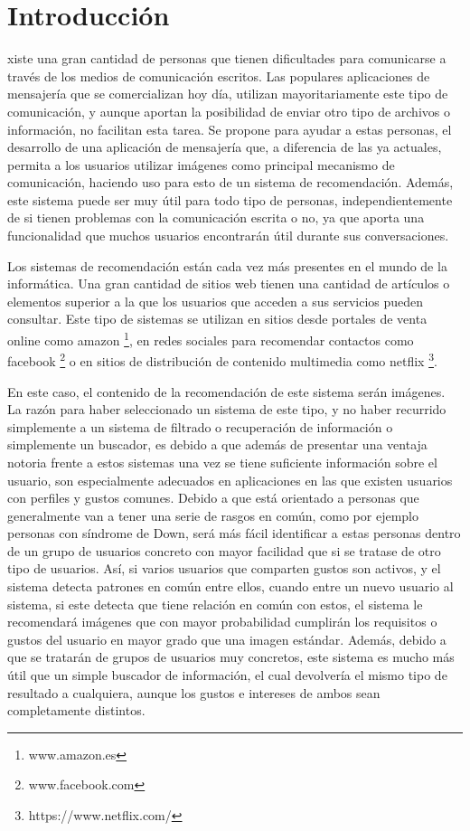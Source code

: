 \chapter{Introducción}
\label{chap:intro}

\noindent
{}xiste una gran cantidad de personas que tienen dificultades para comunicarse a través de los medios de comunicación escritos. Las populares aplicaciones de mensajería que se comercializan hoy día, utilizan mayoritariamente este tipo de comunicación, y aunque  aportan la posibilidad de enviar otro tipo de archivos o información, no facilitan esta tarea. Se propone para ayudar a estas personas, el desarrollo de una aplicación de mensajería que, a diferencia de las ya actuales, permita a los usuarios utilizar imágenes como principal mecanismo de comunicación, haciendo uso para esto de un sistema de recomendación. Además, este sistema puede ser muy útil para todo tipo de personas, independientemente de si tienen problemas con la comunicación escrita o no, ya que aporta una funcionalidad que muchos usuarios encontrarán útil durante sus conversaciones.


Los sistemas de recomendación están cada vez más presentes en el mundo de la informática. Una gran cantidad de sitios web tienen una cantidad de artículos o elementos superior a la que los usuarios que acceden a sus servicios pueden consultar. Este tipo de sistemas se utilizan en sitios desde portales de venta online como amazon \footnote{www.amazon.es}, en redes sociales para recomendar contactos como facebook \footnote{www.facebook.com} o en sitios de distribución de contenido multimedia como netflix \footnote{https://www.netflix.com/}. 

En este caso, el contenido de la recomendación de este sistema serán imágenes. La razón para haber seleccionado un sistema de este tipo, y no haber recurrido simplemente a un sistema de filtrado o recuperación de información o simplemente un buscador, es debido a que además de presentar una ventaja notoria frente a estos sistemas una vez se tiene suficiente información sobre el usuario, son especialmente adecuados en aplicaciones en las que existen usuarios con perfiles y gustos comunes. Debido a que está orientado a personas que generalmente van a tener una serie de rasgos en común, como por ejemplo personas con síndrome de Down, será más fácil identificar a estas personas dentro de un grupo de usuarios concreto con mayor facilidad que si se tratase de otro tipo de usuarios. Así, si varios usuarios que comparten gustos son activos, y el sistema detecta patrones en común entre ellos, cuando entre un nuevo usuario al sistema, si este detecta que tiene relación en común con estos, el sistema le recomendará imágenes que con mayor probabilidad cumplirán los requisitos o gustos del usuario en mayor grado que una imagen estándar. Además, debido a que se tratarán de grupos de usuarios muy concretos, este sistema es mucho más útil que un simple buscador de información, el cual devolvería el mismo tipo de resultado a cualquiera, aunque los gustos e intereses de ambos sean completamente distintos. 

